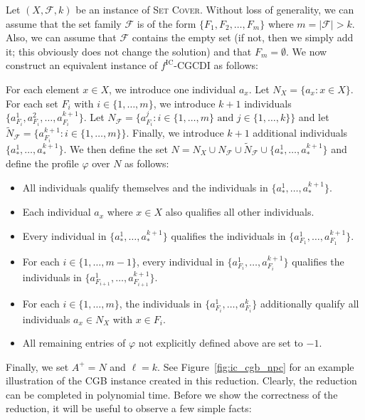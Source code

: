 \documentclass[
    12pt,               %
    a4paper,            %
    bibtotoc,           %
    pointlessnumbers,   %
    ngerman,            %
    titlepage,          %
    leqno,              %
    ]{scrarticle}       %
\newcommand\figref{Figure~\ref}
\begin{document}
\begin{Proof}
Let $(X, \mathcal{F}, k)$ be an instance of \textsc{Set Cover}. Without loss of generality, we can assume that the set family $\mathcal{F}$ is of the form $\{ F_1, F_2, \ldots, F_m \}$ where $m = |\mathcal{F}| > k$. Also, we can assume that $\mathcal{F}$ contains the empty set (if not, then we simply add it; this obviously does not change the solution) and that $F_m = \emptyset$. We now construct an equivalent instance of $f^{\text{IC}}$-CGCDI as follows:

For each element $x \in X$, we introduce one individual $a_x$. Let $N_X = \{ a_x : x \in X \}$. For each set $F_i$ with $i \in \{ 1, \ldots, m \}$, we introduce $k+1$ individuals $\{ a^1_{F_i}, a^2_{F_i}, \ldots, a^{k+1}_{F_i} \}$. Let $N_\mathcal{F} = \big\{ a^j_{F_i} : i \in \{ 1, \ldots, m \} \text{ and } j \in \{ 1, \ldots, k \} \big\}$ and let $\tilde{N}_\mathcal{F} = \big\{ a^{k+1}_{F_i} : i \in \{ 1, \ldots, m \} \big\}$. Finally, we introduce $k+1$ additional individuals $\{ a^1_\ast, \ldots, a^{k+1}_\ast \}$. We then define the set $N = N_X \cup N_\mathcal{F} \cup \tilde{N}_\mathcal{F} \cup \{ a^1_\ast, \ldots, a^{k+1}_\ast \}$ and define the profile $\varphi$ over $N$ as follows:

\begin{itemize}[nolistsep]
\item
All individuals qualify themselves and the individuals in $\{ a^1_\ast, \ldots, a^{k+1}_\ast \}$.
\item
Each individual $a_x$ where $x \in X$ also qualifies all other individuals.
\item
Every individual in $\{ a^1_\ast, \ldots, a^{k+1}_\ast \}$ qualifies the individuals in $\{ a^1_{F_1}, \ldots, a^{k+1}_{F_1} \}$.
\item
For each $i \in \{ 1, \ldots, m-1 \}$, every individual in $\{ a^1_{F_i}, \ldots, a^{k+1}_{F_i} \}$ qualifies the individuals in $\{ a^1_{F_{i+1}}, \ldots, a^{k+1}_{F_{i+1}} \}$.
\item
For each $i \in \{ 1, \ldots, m \}$, the individuals in $\{ a^1_{F_i}, \ldots, a^k_{F_i} \}$ additionally qualify all individuals $a_x \in N_X$ with $x \in F_i$.
\item
All remaining entries of $\varphi$ not explicitly defined above are set to $-1$.
\end{itemize}

Finally, we set $A^+ = N$ and $\ell = k$. See \figref{fig:ic_cgb_npc} for an example illustration of the CGB instance created in this reduction. Clearly, the reduction can be completed in polynomial time. Before we show the correctness of the reduction, it will be useful to observe a few simple facts:




\end{Proof}
\end{document}
